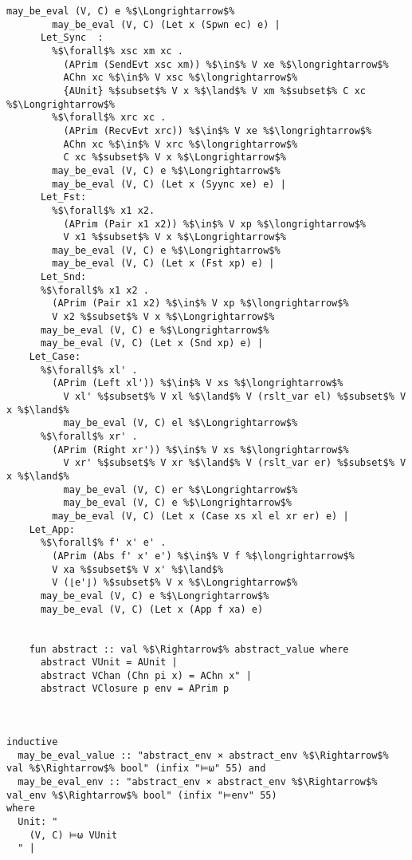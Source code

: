 \documentclass{article}
\begin{document}
\begin{lstlisting}[style=codestyle1, escapechar=\%]
        may_be_eval (V, C) e %$\Longrightarrow$%  
        may_be_eval (V, C) (Let x (Spwn ec) e) |
      Let_Sync  : 
        %$\forall$% xsc xm xc . 
          (APrim (SendEvt xsc xm)) %$\in$% V xe %$\longrightarrow$% 
          AChn xc %$\in$% V xsc %$\longrightarrow$%
          {AUnit} %$subset$% V x %$\land$% V xm %$subset$% C xc %$\Longrightarrow$%
        %$\forall$% xrc xc . 
          (APrim (RecvEvt xrc)) %$\in$% V xe %$\longrightarrow$%
          AChn xc %$\in$% V xrc %$\longrightarrow$%
          C xc %$subset$% V x %$\Longrightarrow$%
        may_be_eval (V, C) e %$\Longrightarrow$%  
        may_be_eval (V, C) (Let x (Syync xe) e) |
      Let_Fst: 
        %$\forall$% x1 x2.
          (APrim (Pair x1 x2)) %$\in$% V xp %$\longrightarrow$%
          V x1 %$subset$% V x %$\Longrightarrow$% 
        may_be_eval (V, C) e %$\Longrightarrow$% 
        may_be_eval (V, C) (Let x (Fst xp) e) |
      Let_Snd: 
      %$\forall$% x1 x2 .
        (APrim (Pair x1 x2) %$\in$% V xp %$\longrightarrow$%
        V x2 %$subset$% V x %$\Longrightarrow$% 
      may_be_eval (V, C) e %$\Longrightarrow$% 
      may_be_eval (V, C) (Let x (Snd xp) e) |
    Let_Case:
      %$\forall$% xl' .
        (APrim (Left xl')) %$\in$% V xs %$\longrightarrow$%
          V xl' %$subset$% V xl %$\land$% V (rslt_var el) %$subset$% V x %$\land$%
          may_be_eval (V, C) el %$\Longrightarrow$%
      %$\forall$% xr' .
        (APrim (Right xr')) %$\in$% V xs %$\longrightarrow$%
          V xr' %$subset$% V xr %$\land$% V (rslt_var er) %$subset$% V x %$\land$%
          may_be_eval (V, C) er %$\Longrightarrow$%
          may_be_eval (V, C) e %$\Longrightarrow$% 
        may_be_eval (V, C) (Let x (Case xs xl el xr er) e) |
    Let_App:
      %$\forall$% f' x' e' .
        (APrim (Abs f' x' e') %$\in$% V f %$\longrightarrow$%
        V xa %$subset$% V x' %$\land$%
        V (⌊e'⌋) %$subset$% V x %$\Longrightarrow$% 
      may_be_eval (V, C) e %$\Longrightarrow$% 
      may_be_eval (V, C) (Let x (App f xa) e)


    fun abstract :: val %$\Rightarrow$% abstract_value where
      abstract VUnit = AUnit |
      abstract VChan (Chn pi x) = AChn x" |
      abstract VClosure p env = APrim p



inductive 
  may_be_eval_value :: "abstract_env × abstract_env %$\Rightarrow$% val %$\Rightarrow$% bool" (infix "⊨ω" 55) and  
  may_be_eval_env :: "abstract_env × abstract_env %$\Rightarrow$% val_env %$\Rightarrow$% bool" (infix "⊨env" 55) 
where
  Unit: "
    (V, C) ⊨ω VUnit
  " |


\end{lstlisting}
\end{document}
